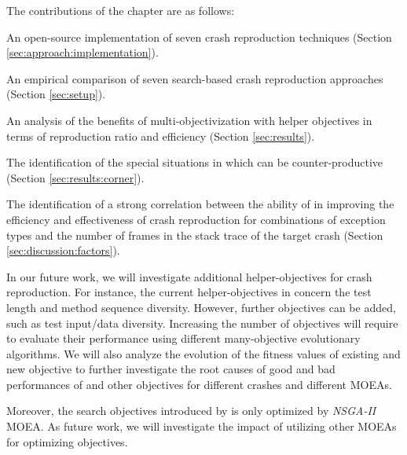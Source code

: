 The contributions of the chapter are as follows:
\begin{compactenum}
    \item An open-source implementation of seven crash reproduction techniques (Section \ref{sec:approach:implementation}).
    \item An empirical comparison of seven search-based crash reproduction approaches (Section \ref{sec:setup}).
    \item An analysis of the benefits of multi-objectiv\-ization with helper objectives in terms of reproduction ratio and efficiency (Section \ref{sec:results}).
    \item The identification of the special situations in which \moho can be counter-productive (Section \ref{sec:results:corner}).
    \item The identification of a strong correlation between the ability of \moho in improving the efficiency and effectiveness of crash reproduction for combinations of exception types and the number of frames in the stack trace of the target crash (Section \ref{sec:discussion:factors}). 
\end{compactenum}

In our future work, we will investigate additional helper-objecti\-ves for crash reproduction. For instance, the current helper-objectiv\-es in \moho concern the test length and method sequence diversity. However, further objectives can be added, such as test input/data diversity. Increasing the number of objectives will require to evaluate their performance using different many-objective evolutionary algorithms. 
We will also analyze the evolution of the fitness values of existing and new objective to further investigate the root causes of good and bad performances of \moho and other objectives for different crashes and different MOEAs. 

Moreover, the search objectives introduced by \decomposition is only optimized by \textit{NSGA-II} MOEA. As future work, we will investigate the impact of utilizing other MOEAs for optimizing \decomposition objectives.
